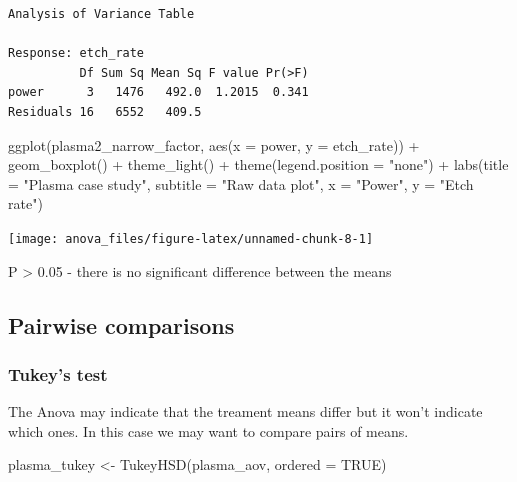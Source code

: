 \documentclass[
]{book}
\newenvironment{Shaded}{\begin{snugshade}}{\end{snugshade}}
\newcommand{\AttributeTok}[1]{\textcolor[rgb]{0.77,0.63,0.00}{#1}}
\newcommand{\ConstantTok}[1]{\textcolor[rgb]{0.00,0.00,0.00}{#1}}
\newcommand{\FunctionTok}[1]{\textcolor[rgb]{0.00,0.00,0.00}{#1}}
\newcommand{\NormalTok}[1]{#1}
\newcommand{\OtherTok}[1]{\textcolor[rgb]{0.56,0.35,0.01}{#1}}
\newcommand{\SpecialCharTok}[1]{\textcolor[rgb]{0.00,0.00,0.00}{#1}}
\newcommand{\StringTok}[1]{\textcolor[rgb]{0.31,0.60,0.02}{#1}}
\begin{document}
\begin{verbatim}
Analysis of Variance Table

Response: etch_rate
          Df Sum Sq Mean Sq F value Pr(>F)
power      3   1476   492.0  1.2015  0.341
Residuals 16   6552   409.5               
\end{verbatim}

\begin{Shaded}
\begin{Highlighting}[]
\FunctionTok{ggplot}\NormalTok{(plasma2\_narrow\_factor, }\FunctionTok{aes}\NormalTok{(}\AttributeTok{x =}\NormalTok{ power, }\AttributeTok{y =}\NormalTok{ etch\_rate)) }\SpecialCharTok{+}
  \FunctionTok{geom\_boxplot}\NormalTok{() }\SpecialCharTok{+}
  \FunctionTok{theme\_light}\NormalTok{() }\SpecialCharTok{+}
  \FunctionTok{theme}\NormalTok{(}\AttributeTok{legend.position =} \StringTok{"none"}\NormalTok{) }\SpecialCharTok{+}
  \FunctionTok{labs}\NormalTok{(}\AttributeTok{title =} \StringTok{"Plasma case study"}\NormalTok{,}
       \AttributeTok{subtitle =} \StringTok{"Raw data plot"}\NormalTok{,}
       \AttributeTok{x =} \StringTok{"Power"}\NormalTok{,}
       \AttributeTok{y =} \StringTok{"Etch rate"}\NormalTok{)}
\end{Highlighting}
\end{Shaded}

\texttt{[image: anova\_files/figure-latex/unnamed-chunk-8-1]}

P \textgreater{} 0.05 - there is no significant difference between the means

\hypertarget{pairwise-comparisons}{%
\subsection{Pairwise comparisons}\label{pairwise-comparisons}}

\hypertarget{tukeyTest}{%
\subsubsection{Tukey's test}\label{tukeyTest}}

The Anova may indicate that the treament means differ but it won't indicate which ones. In this case we may want to compare pairs of means.

\begin{Shaded}
\begin{Highlighting}[]
\NormalTok{plasma\_tukey }\OtherTok{\textless{}{-}} \FunctionTok{TukeyHSD}\NormalTok{(plasma\_aov, }\AttributeTok{ordered =} \ConstantTok{TRUE}\NormalTok{)}
\end{Highlighting}
\end{Shaded}
\end{document}
